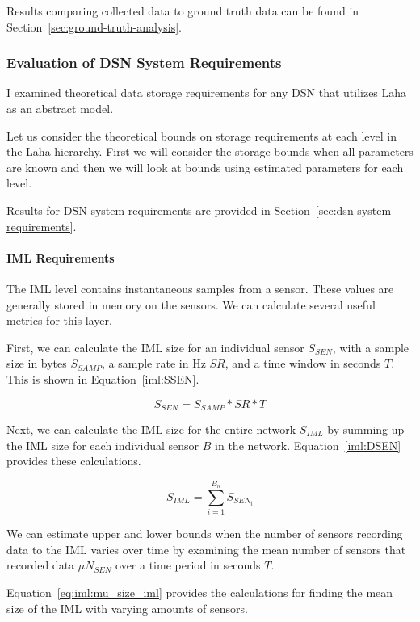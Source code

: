 Results comparing collected data to ground truth data can be found in Section~\ref{sec:ground-truth-analysis}.

\subsubsection{Evaluation of DSN System Requirements}\label{sssec:eval_of_dsn_system_requirements}
I examined theoretical data storage requirements for any DSN that utilizes Laha as an abstract model.

Let us consider the theoretical bounds on storage requirements at each level in the Laha hierarchy. First we will consider the storage bounds when all parameters are known and then we will look at bounds using estimated parameters for each level.

Results for DSN system requirements are provided in Section~\ref{sec:dsn-system-requirements}.

\paragraph{IML Requirements}
The IML level contains instantaneous samples from a sensor. These values are generally stored in memory on the sensors. We can calculate several useful metrics for this layer.

First, we can calculate the IML size for an individual sensor $S_{SEN}$, with a sample size in bytes $S_{SAMP}$, a sample rate in Hz $SR$, and a time window in seconds $T$. This is shown in Equation~\ref{iml:SSEN}.

\begin{equation}\label{iml:SSEN}
	S_{SEN} = S_{SAMP} * SR * T
\end{equation}

Next, we can calculate the IML size for the entire network $S_{IML}$ by summing up the IML size for each individual sensor $B$ in the network. Equation~\ref{iml:DSEN} provides these calculations.

\begin{equation}\label{iml:DSEN}
	S_{IML} = \sum_{i=1}^{B_{n}} S_{SEN_{i}}
\end{equation}

We can estimate upper and lower bounds when the number of sensors recording data to the IML varies over time by examining the mean number of sensors that recorded data $\mu N_{SEN}$ over a time period in seconds $T$.

Equation~\ref{eq:iml:mu_size_iml} provides the calculations for finding the mean size of the IML with varying amounts of sensors.


